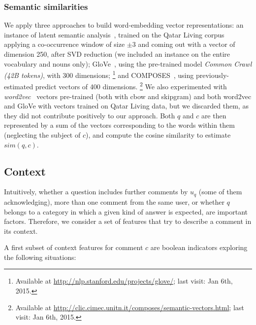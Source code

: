 \subsubsection{Semantic similarities}
\label{sub:semantic}

We apply three approaches to build  word-embedding vector representations:
\Ni an instance of latent semantic analysis~\cite{croce-previtali:2010:GEMS}, 
trained on the Qatar Living corpus applying a co-occurrence window of size 
$\pm3$ and coming out with a vector of dimension 250, after SVD reduction (we 
included an instance on the entire vocabulary and nouns only);
\Nii GloVe~\cite{Pennington:2014}, using the pre-trained model \textit{Common 
Crawl (42B tokens)}, with 300 dimensions;%
\footnote{Available at \url{http://nlp.stanford.edu/projects/glove/}; last 
visit: Jan 6th, 2015.}
and \Niii COMPOSES~\cite{Baroni:2014}, using previously-estimated predict 
vectors of 400 dimensions.%
\footnote{Available at 
\url{http://clic.cimec.unitn.it/composes/semantic-vectors.html}; last visit: Jan 
6th, 2015.}
We also experimented with \textit{word2vec}~\cite{Mikolov:2013} 
vectors pre-trained (both with cbow and skipgram) and both word2vec and GloVe 
with vectors trained on Qatar Living data, but we discarded them, as they did 
not contribute positively to our approach.
Both $q$ and $c$ are then represented by a sum of the vectors 
corresponding to the words within them (neglecting the subject of $c$), and 
compute the cosine similarity to estimate $sim(q,c)$. 


\subsection{Context}
\label{ssub:context}

Intuitively, whether a question includes further comments by $u_q$ (some of them 
acknowledging), more than one comment from the same user, or whether $q$ belongs 
to a category in which a given kind of answer is expected, are important 
factors. Therefore, we consider a set of features that try to describe a comment 
in its context.   

A first subset of context features for comment $c$ are boolean indicators 
exploring the following situations: %

